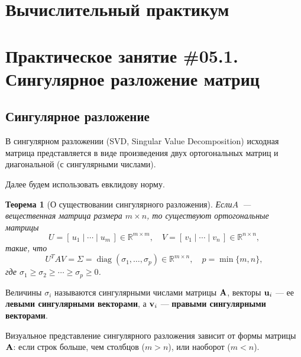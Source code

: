 \documentclass[12pt]{article}
\newtheorem{theorem}{Теорема}
\begin{document}
	\begin{flushright}
	\end{flushright}
	\begin{flushright}
	\end{flushright}
    \section*{Вычислительный практикум}
    \section*{Практическое занятие \#05.1. Сингулярное разложение матриц}
	
	\subsection*{Сингулярное разложение}
	
	В сингулярном разложении (SVD, Singular Value Decomposition) исходная матрица представляется в виде произведения двух ортогональных матриц и диагональной (с сингулярными числами).
	
	Далее будем использовать евклидову норму.
	
	\begin{theorem}[О существовании сингулярного разложения]
		Если\linebreak $A$~--- вещественная матрица размера $m \times n$,
		то существуют ортогональные матрицы
		\begin{equation}
			U = [\, u_1 \mid \cdots \mid u_m \,] \in \mathbb{R}^{m \times m},
			\quad
			V = [\, v_1 \mid \cdots \mid v_n \,] \in \mathbb{R}^{n \times n},
		\end{equation}
		такие, что
		\begin{equation}
			U^T A V = \Sigma = \operatorname{diag}(\sigma_1, \ldots, \sigma_p) \in \mathbb{R}^{m \times n},
			\quad
			p = \min\{m, n\},
		\end{equation}
		где $\sigma_1 \geqslant \sigma_2 \geqslant \cdots \geqslant \sigma_p \geqslant 0$.
	\end{theorem}
	
		Величины $\sigma_i$ называются сингулярными числами матрицы $\textbf{\textup{A}}$, 
		векторы $\textbf{\textup{u}}_i$ --- ее \textbf{левыми сингулярными векторами}, 
		а $\textbf{\textup{v}}_i$ --- \textbf{правыми сингулярными векторами}.  
		
		Визуальное представление сингулярного разложения зависит от формы матрицы $\textbf{\textup{A}}$: 
		если строк больше, чем столбцов ($m > n$), или наоборот ($m < n$).  
		
\end{document}
